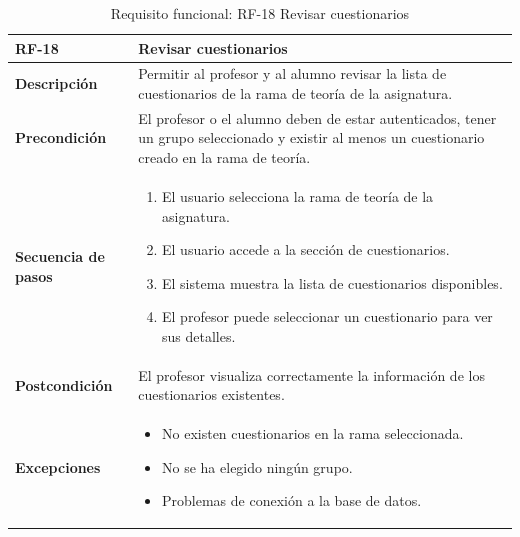 \begin{table}[H]
\centering
\begin{tabularx}{\textwidth}{
  |>{\centering\arraybackslash}l
  |>{\centering\arraybackslash}X|}
\hline
\textbf{RF-18} & \textbf{Revisar cuestionarios} \\ \hline

\textbf{Descripción} & Permitir al profesor y al alumno revisar la lista de cuestionarios de la rama de teoría de la asignatura. \\ \hline

\textbf{Precondición} & El profesor o el alumno deben de estar autenticados, tener un grupo seleccionado y existir al menos un cuestionario creado en la rama de teoría. \\ \hline

\textbf{Secuencia de pasos} & 
\begin{enumerate}
  \item El usuario selecciona la rama de teoría de la asignatura.
  \item El usuario accede a la sección de cuestionarios.
  \item El sistema muestra la lista de cuestionarios disponibles.
  \item El profesor puede seleccionar un cuestionario para ver sus detalles.
\end{enumerate} \\ \hline

\textbf{Postcondición} & El profesor visualiza correctamente la información de los cuestionarios existentes. \\ \hline

\textbf{Excepciones} & 
\begin{itemize}
  \item No existen cuestionarios en la rama seleccionada.
  \item No se ha elegido ningún grupo.
  \item Problemas de conexión a la base de datos.
\end{itemize} \\ \hline
\end{tabularx}
\caption{Requisito funcional: RF-18 Revisar cuestionarios}
\end{table}


